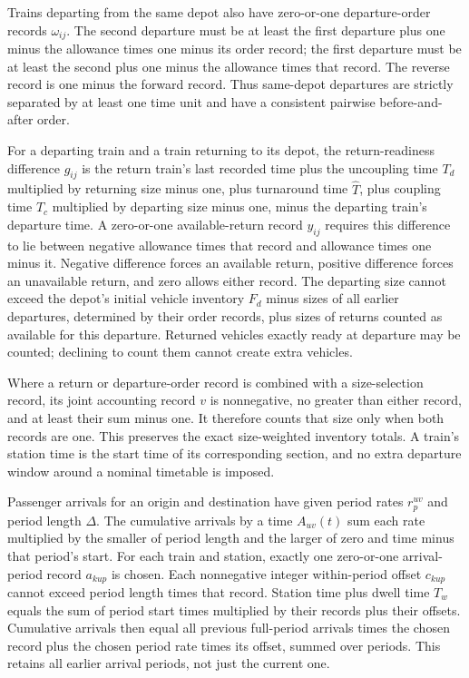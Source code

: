 \documentclass[10pt]{article}
\begin{document}
Trains departing from the same depot also have zero-or-one departure-order records $\omega_{ij}$. The second departure must be at least the first departure plus one minus the allowance times one minus its order record; the first departure must be at least the second plus one minus the allowance times that record. The reverse record is one minus the forward record. Thus same-depot departures are strictly separated by at least one time unit and have a consistent pairwise before-and-after order.

For a departing train and a train returning to its depot, the return-readiness difference $g_{ij}$ is the return train's last recorded time plus the uncoupling time $T_d$ multiplied by returning size minus one, plus turnaround time $\hat T$, plus coupling time $T_c$ multiplied by departing size minus one, minus the departing train's departure time. A zero-or-one available-return record $y_{ij}$ requires this difference to lie between negative allowance times that record and allowance times one minus it. Negative difference forces an available return, positive difference forces an unavailable return, and zero allows either record. The departing size cannot exceed the depot's initial vehicle inventory $F_d$ minus sizes of all earlier departures, determined by their order records, plus sizes of returns counted as available for this departure. Returned vehicles exactly ready at departure may be counted; declining to count them cannot create extra vehicles.

Where a return or departure-order record is combined with a size-selection record, its joint accounting record $v$ is nonnegative, no greater than either record, and at least their sum minus one. It therefore counts that size only when both records are one. This preserves the exact size-weighted inventory totals. A train's station time is the start time of its corresponding section, and no extra departure window around a nominal timetable is imposed.

Passenger arrivals for an origin and destination have given period rates $r_p^{uv}$ and period length $\Delta$. The cumulative arrivals by a time $A_{uv}(t)$ sum each rate multiplied by the smaller of period length and the larger of zero and time minus that period's start. For each train and station, exactly one zero-or-one arrival-period record $a_{kup}$ is chosen. Each nonnegative integer within-period offset $c_{kup}$ cannot exceed period length times that record. Station time plus dwell time $T_w$ equals the sum of period start times multiplied by their records plus their offsets. Cumulative arrivals then equal all previous full-period arrivals times the chosen record plus the chosen period rate times its offset, summed over periods. This retains all earlier arrival periods, not just the current one.
\end{document}
